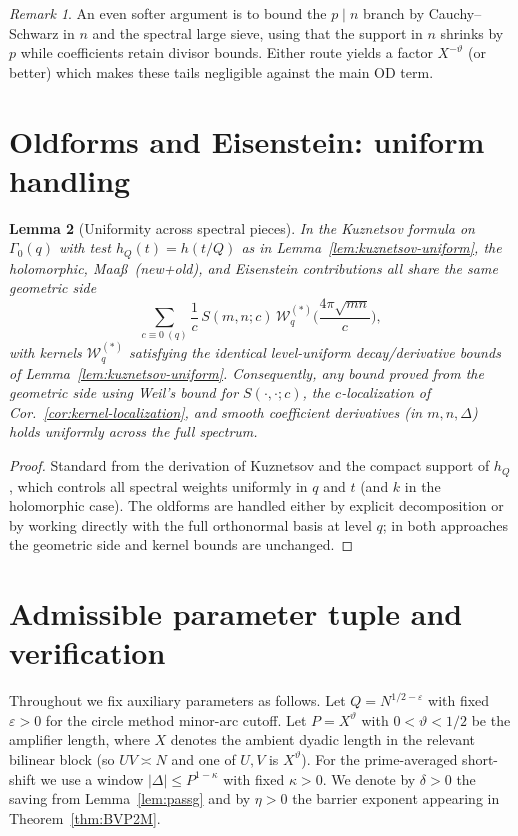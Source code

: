 \documentclass[11pt]{article}
\newtheorem{lemma}{Lemma}[part]
\theoremstyle{definition}
\theoremstyle{remark}
\newtheorem{remark}[lemma]{Remark}
\numberwithin{equation}{part}
\begin{document}
\begin{remark}
	An even softer argument is to bound the $p\mid n$ branch by Cauchy--Schwarz in $n$ and the spectral large sieve, using that the support in $n$ shrinks by $p$ while coefficients retain divisor bounds. Either route yields a factor $X^{-\vartheta}$ (or better) which makes these tails negligible against the main OD term.
\end{remark}

\section{Oldforms and Eisenstein: uniform handling}\label{sec:old-eis}

\begin{lemma}[Uniformity across spectral pieces]\label{lem:oldforms-eis-uniform}
	In the Kuznetsov formula on $\Gamma_0(q)$ with test $h_Q(t)=h(t/Q)$ as in Lemma~\ref{lem:kuznetsov-uniform},
	the holomorphic, Maa\ss\ (new+old), and Eisenstein contributions all share the same geometric side
	\[
		\sum_{c\equiv 0\ (q)} \frac{1}{c}\,S(m,n;c)\,\mathcal W_q^{(*)}\!\Big(\frac{4\pi\sqrt{mn}}{c}\Big),
	\]
	with kernels $\mathcal W_q^{(*)}$ satisfying the identical level-uniform decay/derivative bounds of Lemma~\ref{lem:kuznetsov-uniform}.
	Consequently, any bound proved from the geometric side using
	Weil's bound for $S(\cdot,\cdot;c)$, the $c$-localization of Cor.~\ref{cor:kernel-localization},
	and smooth coefficient derivatives (in $m,n,\Delta$) holds \emph{uniformly} across the full spectrum.
\end{lemma}

\begin{proof}
	Standard from the derivation of Kuznetsov and the compact support of $h_Q$, which controls all spectral weights uniformly in $q$ and $t$ (and $k$ in the holomorphic case). The oldforms are handled either by explicit decomposition or by working directly with the full orthonormal basis at level $q$; in both approaches the geometric side and kernel bounds are unchanged.
\end{proof}

\section{Admissible parameter tuple and verification}
\label{app:parameters}

Throughout we fix auxiliary parameters as follows. Let $Q=N^{1/2-\varepsilon}$ with fixed $\varepsilon>0$ for the circle method minor-arc cutoff. Let $P=X^{\vartheta}$ with $0<\vartheta<1/2$ be the amplifier length, where $X$ denotes the ambient dyadic length in the relevant bilinear block (so $UV\asymp N$ and one of $U,V$ is $X^{\vartheta}$). For the prime-averaged short-shift we use a window $|\Delta|\le P^{1-\kappa}$ with fixed $\kappa>0$. We denote by $\delta>0$ the saving from Lemma~\ref{lem:passg} and by $\eta>0$ the barrier exponent appearing in Theorem~\ref{thm:BVP2M}.
\end{document}
